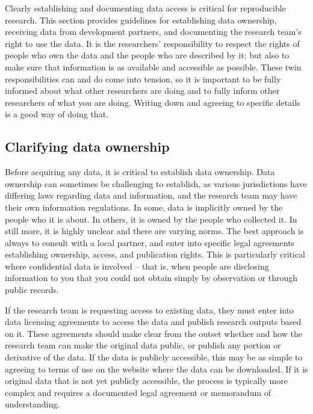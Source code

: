 Clearly establishing and documenting data access is critical for reproducible research.
This section provides guidelines for
establishing data ownership, receiving data from development partners,
and documenting the research team's right to use the data.
It is the researchers' responsibility to respect the rights
of people who own the data and the people who are described by it;
but also to make sure that information is as available and accessible as possible.
These twin responsibilities can and do come into tension,
so it is important to be fully informed about what other researchers are doing
and to fully inform other researchers of what you are doing.
Writing down and agreeing to specific details is a good way of doing that.


\subsection{Clarifying data ownership}
Before acquiring any data, it is critical to establish data ownership.
Data ownership
can sometimes be challenging to establish,
as various jurisdictions have differing laws regarding data and information,
and the research team may have their own information regulations.
In some, data is implicitly owned by the people who it is about.
In others, it is owned by the people who collected it.
In still more, it is highly unclear and there are varying norms.
The best approach is always to consult with a local partner,
and enter into specific legal agreements establishing ownership,
access, and publication rights.
This is particularly critical where confidential data is involved
-- that is, when people are disclosing information to you
that you could not obtain simply by observation or through public records.

If the research team is requesting access to existing data,
they must enter into data licensing agreements
to access the data and publish research outputs based on it.
These agreements should make clear from the outset whether and how the
research team can make the original data public, or publish any portion or derivative of the data.
If the data is publicly accessible,
this may be as simple to agreeing to terms of use on the website where the data can be downloaded.
If it is original data that is not yet publicly accessible,
the process is typically more complex and requires a documented legal agreement or memorandum of understanding.

